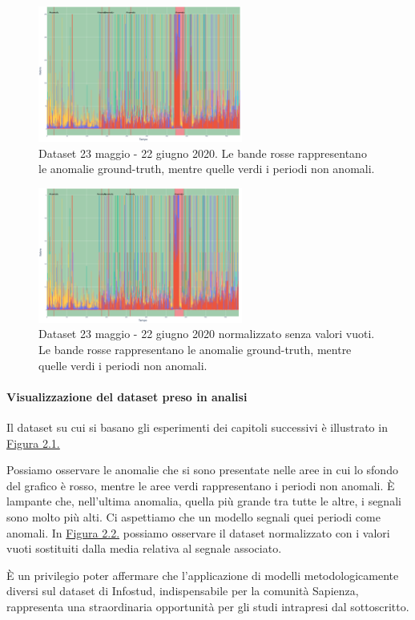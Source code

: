     \begin{figure}[H]
        \centering
        \includegraphics[width=0.6\textwidth]{./input/chapters/figs/plot-infostud.png}
        \caption{Dataset 23 maggio - 22 giugno 2020. Le bande rosse rappresentano le anomalie ground-truth, mentre quelle 
        verdi i periodi non anomali.}
        \label{fig:dataset-giugno}
    \end{figure}
    \begin{figure}[H]
        \centering
        \includegraphics[width=0.6\textwidth]{./input/chapters/figs/plot-infostud-norm.png}
        \caption{Dataset 23 maggio - 22 giugno 2020 normalizzato senza valori vuoti. Le bande rosse rappresentano le anomalie ground-truth, mentre quelle 
        verdi i periodi non anomali.}
        \label{fig:dataset-giugno-norm}
    \end{figure}    
    

\paragraph{Visualizzazione del dataset preso in analisi}
    Il dataset su cui si basano gli esperimenti dei capitoli successivi è illustrato in 
    \hyperref[fig:dataset-giugno]{Figura 2.1.} 
    
    Possiamo osservare le anomalie che si sono presentate nelle aree in cui lo sfondo del grafico è rosso, 
    mentre le aree verdi rappresentano i periodi non anomali. È lampante che, nell'ultima anomalia, quella più 
    grande tra tutte le altre, i segnali sono molto più alti. Ci aspettiamo che un modello segnali quei periodi come 
    anomali. In \hyperref[fig:dataset-giugno-norm]{Figura 2.2.} possiamo osservare il dataset normalizzato con i 
    valori vuoti sostituiti dalla media relativa al segnale associato.

    È un privilegio poter affermare che l'applicazione di modelli metodologicamente diversi sul dataset di Infostud, indispensabile
    per la comunità Sapienza, rappresenta una straordinaria opportunità per gli studi intrapresi dal sottoscritto.